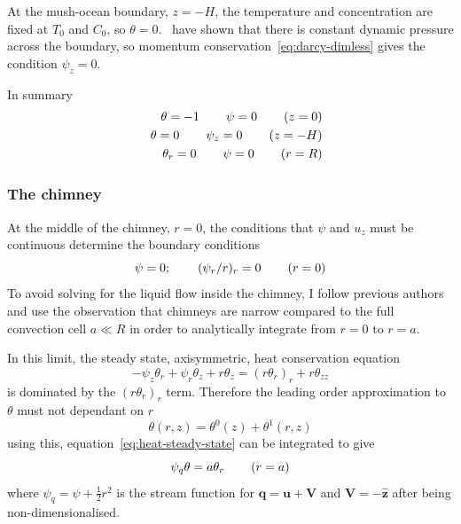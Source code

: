 \documentclass[11pt]{proc}
\begin{document}
At the mush-ocean boundary, $z=-H$, the temperature and concentration are fixed at $T_0$ and $C_0$, so $\theta=0$.~\citet*{emms-fowler-94} have shown that there is constant dynamic pressure across the boundary, so momentum conservation~\eqref{eq:darcy-dimless} gives the condition $\psi_z = 0$. 

In summary
\begin{eqnarray}
&&\theta = -1   \hspace{5ex} \psi = 0   \hspace{5ex} (z=0) \\
&&\theta = 0   \hspace{5ex} \psi_z = 0   \hspace{5ex} (z=-H) \\
&&\theta_r = 0   \hspace{5ex} \psi = 0   \hspace{5ex} (r=R)
\end{eqnarray}

\subsubsection{The chimney}
At the middle of the chimney, $r=0$, the conditions that $\psi$ and $u_z$ must be continuous determine the boundary conditions 
\begin{equation}
\label{eq:axi-chimney-bcs}
\psi = 0; \hspace{5ex} (\psi_r/r)_r = 0   \hspace{5ex} (r=0)
\end{equation}
To avoid solving for the liquid flow inside the chimney, I follow previous authors~\citep*{schulze-worster-98,chung-worster-02,wells-et-al-10} and use the observation that chimneys are narrow compared to the full convection cell $a\ll R$ in order to analytically integrate from $r=0$ to $r=a$. 

In this limit, the steady state, axisymmetric, heat conservation equation
\begin{equation}
\label{eq:heat-steady-state}
-\psi_z \theta_r + \psi_r \theta_z + r \theta_z = (r \theta_r)_r + r \theta_{zz}
\end{equation}
is dominated by the $(r \theta_r)_r$ term. Therefore the leading order approximation to $\theta$ must not dependant on $r$ \begin{equation}
\label{eq:theta-approx}
\theta(r,z) = \theta^0(z) + \theta^1(r,z)
\end{equation}
using this, equation~\ref{eq:heat-steady-state} can be integrated to give
\begin{equation}
\label{eq:theta-a-bc}
\psi_q \theta = a \theta_r   \hspace{5ex} (r=a)
\end{equation}
where $\psi_q = \psi + \frac{1}{2} r^2$ is the stream function for $\mathbf{q} = \mathbf{u} + \mathbf{V}$ and $\mathbf{V} = - \mathbf{\hat{z}}$ after being non-dimensionalised.
\end{document}
